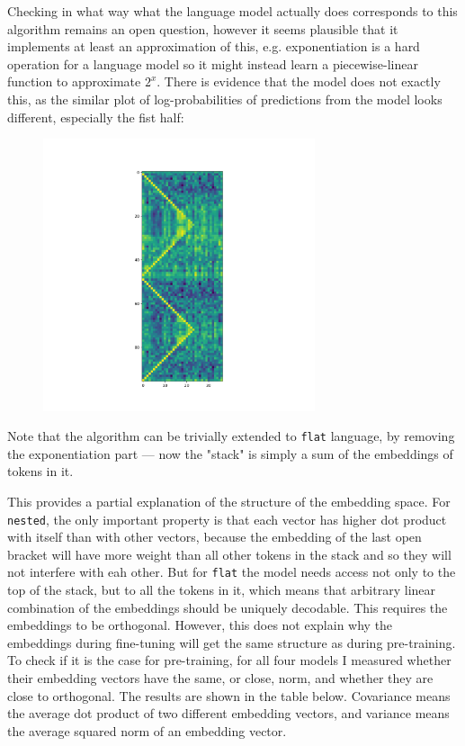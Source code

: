 \documentclass[a4paper, 11pt, oneside]{article}
\begin{document}
	Checking in what way what the language model actually does corresponds to this
	algorithm remains an open question, however it seems plausible that it
	implements at least an approximation of this, e.g. exponentiation is a hard
	operation for a language model so it might instead learn a piecewise-linear
	function to approximate $2^{x}$. There is evidence that the model does not exactly
	this, as the similar plot of log-probabilities of predictions from the model
	looks different, especially the fist half:

	\begin{figure}[t]
		\includegraphics[width=8cm]{img/observed.png}
		\centering
	\end{figure}

	Note that the algorithm can be trivially extended to \texttt{flat} language,
	by removing the exponentiation part --- now the "stack" is simply a sum of the
	embeddings of tokens in it.

	This provides a partial explanation of the structure of the embedding space. For
	\texttt{nested}, the only important property is that each vector has higher dot
	product with itself than with other vectors, because the embedding of the last
	open bracket will have more weight than all other tokens in the stack and so
	they will not interfere with eah other. But for \texttt{flat} the model needs
	access not only to the top of the stack, but to all the tokens in it, which
	means that arbitrary linear combination of the embeddings should be uniquely
	decodable. This requires the embeddings to be orthogonal. However, this does not
	explain why the embeddings during fine-tuning will get the same structure as during
	pre-training. To check if it is the case for pre-training, for all four models
	I measured whether their embedding vectors have the same, or close, norm, and
	whether they are close to orthogonal. The results are shown in the table below.
	Covariance means the average dot product of two different embedding vectors, and
	variance means the average squared norm of an embedding vector.
\end{document}

